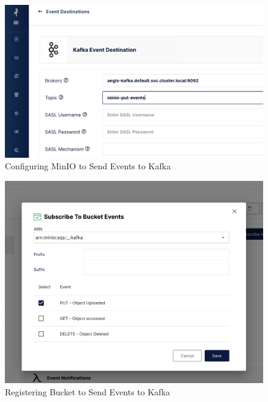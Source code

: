 \documentclass[12pt, conference, final, a4paper, onecolumn, compsoc]{IEEEtran}
\begin{document}








\begin{figure}[H]
  \centering \includegraphics[scale=0.45]{images/minio-event-queue.png}
  \caption{Configuring MinIO to Send Events to Kafka}
  \label{appendix:minio-event-queue}
\end{figure}

\begin{figure}[H]
  \centering \includegraphics[scale=0.31]{images/minio-bucket-event.png}
  \caption{Registering Bucket to Send Events to Kafka}
  \label{appendix:minio-bucket-event}
\end{figure}
\end{document}
